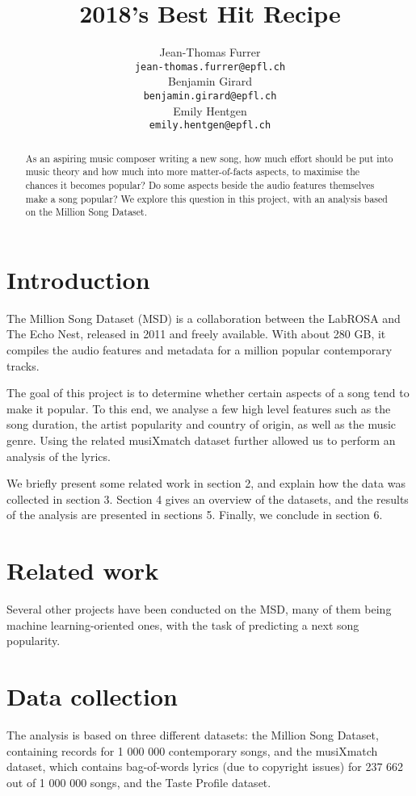 \documentclass[10pt]{article}
\title{2018's Best Hit Recipe}
\author{Jean-Thomas Furrer \\
  {\small\tt jean-thomas.furrer@epfl.ch} \\\And
  Benjamin Girard \\
  {\small\tt benjamin.girard@epfl.ch} \\\And
  Emily Hentgen \\
{\small\tt emily.hentgen@epfl.ch} \\}
\date{}
\renewcommand\_{\textunderscore\allowbreak}
\begin{document}
\maketitle
\begin{abstract}


As an aspiring music composer writing a new song, how much effort should be put into music theory and how much into more matter-of-facts aspects, to maximise the chances it becomes popular?
Do some aspects beside the audio features themselves make a song popular?
We explore this question in this project, with an analysis based on the Million Song Dataset.
\end{abstract}

\section{Introduction}
The Million Song Dataset (MSD) is a collaboration between the LabROSA and The Echo Nest, released in 2011 and freely available.
With about 280 GB, it compiles the audio features and metadata for a million popular contemporary tracks. 

The goal of this project is to determine whether certain aspects of a song tend to make it popular.
To this end, we analyse a few high level features such as the song duration, the artist popularity and country of origin, as well as the music genre. 
Using the related musiXmatch dataset further allowed us to perform an analysis of the lyrics.

We briefly present some related work in section 2, and explain how the data was collected in section 3. Section 4 gives an overview of the datasets, and the results of the analysis are presented in sections 5. Finally, we conclude in section 6.

\section{Related work}
Several other projects have been conducted on the MSD, many of them being machine learning-oriented ones, with the task of predicting a next song popularity.

\section{Data collection}
The analysis is based on three different datasets: the Million Song Dataset, containing records for 1 000 000 contemporary songs, and the musiXmatch dataset, which contains bag-of-words lyrics (due to copyright issues) for 237 662 out of 1 000 000 songs, and the Taste Profile dataset.
\end{document}

